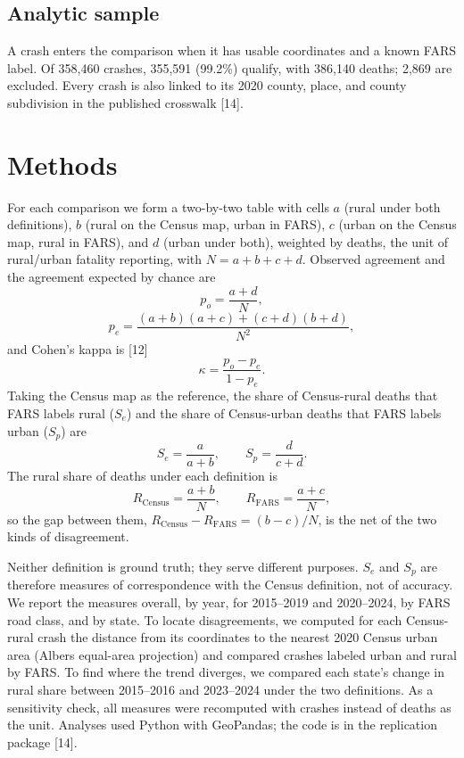 \documentclass{article}
\begin{document}
\subsection{Analytic sample}

A crash enters the comparison when it has usable coordinates and a known FARS label. Of 358{,}460 crashes, 355{,}591 (99.2\%) qualify, with 386{,}140 deaths; 2{,}869 are excluded. Every crash is also linked to its 2020 county, place, and county subdivision in the published crosswalk [14].

\section{Methods}

For each comparison we form a two-by-two table with cells $a$ (rural under both definitions), $b$ (rural on the Census map, urban in FARS), $c$ (urban on the Census map, rural in FARS), and $d$ (urban under both), weighted by deaths, the unit of rural/urban fatality reporting, with $N=a+b+c+d$. Observed agreement and the agreement expected by chance are
\begin{equation}
p_o = \frac{a+d}{N},
\end{equation}
\begin{equation}
p_e = \frac{(a+b)(a+c)+(c+d)(b+d)}{N^2},
\end{equation}
and Cohen's kappa is [12]
\begin{equation}
\kappa = \frac{p_o - p_e}{1 - p_e}.
\end{equation}
Taking the Census map as the reference, the share of Census-rural deaths that FARS labels rural ($S_e$) and the share of Census-urban deaths that FARS labels urban ($S_p$) are
\begin{equation}
S_e = \frac{a}{a+b}, \qquad S_p = \frac{d}{c+d}.
\end{equation}
The rural share of deaths under each definition is
\begin{equation}
R_{\mathrm{Census}} = \frac{a+b}{N}, \qquad R_{\mathrm{FARS}} = \frac{a+c}{N},
\end{equation}
so the gap between them, $R_{\mathrm{Census}}-R_{\mathrm{FARS}} = (b-c)/N$, is the net of the two kinds of disagreement.

Neither definition is ground truth; they serve different purposes. $S_e$ and $S_p$ are therefore measures of correspondence with the Census definition, not of accuracy. We report the measures overall, by year, for 2015--2019 and 2020--2024, by FARS road class, and by state. To locate disagreements, we computed for each Census-rural crash the distance from its coordinates to the nearest 2020 Census urban area (Albers equal-area projection) and compared crashes labeled urban and rural by FARS. To find where the trend diverges, we compared each state's change in rural share between 2015--2016 and 2023--2024 under the two definitions. As a sensitivity check, all measures were recomputed with crashes instead of deaths as the unit. Analyses used Python with GeoPandas; the code is in the replication package [14].
\end{document}
